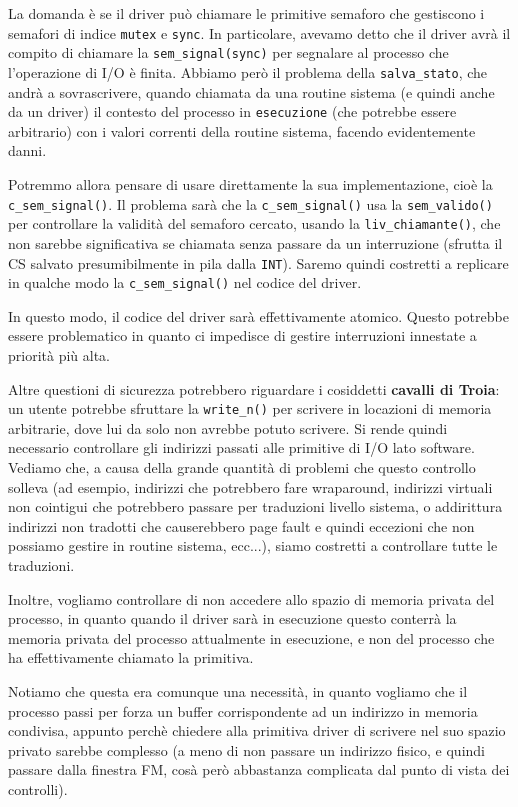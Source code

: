 \documentclass[a4paper,11pt]{article}
\begin{document}
La domanda è se il driver può chiamare le primitive semaforo che gestiscono i semafori di indice \lstinline|mutex| e \lstinline|sync|.
In particolare, avevamo detto che il driver avrà il compito di chiamare la \lstinline|sem_signal(sync)| per segnalare al processo che l'operazione di I/O è finita.
Abbiamo però il problema della \lstinline|salva_stato|, che andrà a sovrascrivere, quando chiamata da una routine sistema (e quindi anche da un driver) il contesto del processo in \lstinline|esecuzione| (che potrebbe essere arbitrario) con i valori correnti della routine sistema, facendo evidentemente danni. 

Potremmo allora pensare di usare direttamente la sua implementazione, cioè la \lstinline|c_sem_signal()|.
Il problema sarà che la \lstinline|c_sem_signal()| usa la \lstinline|sem_valido()| per controllare la validità del semaforo cercato, usando la \lstinline|liv_chiamante()|, che non sarebbe significativa se chiamata senza passare da un interruzione (sfrutta il CS salvato presumibilmente in pila dalla \lstinline|INT|).
Saremo quindi costretti a replicare in qualche modo la \lstinline|c_sem_signal()| nel codice del driver.

In questo modo, il codice del driver sarà effettivamente atomico.
Questo potrebbe essere problematico in quanto ci impedisce di gestire interruzioni innestate a priorità più alta.

Altre questioni di sicurezza potrebbero riguardare i cosiddetti \textbf{cavalli di Troia}: un utente potrebbe sfruttare la \lstinline|write_n()| per scrivere in locazioni di memoria arbitrarie, dove lui da solo non avrebbe potuto scrivere.
Si rende quindi necessario controllare gli indirizzi passati alle primitive di I/O lato software.
Vediamo che, a causa della grande quantità di problemi che questo controllo solleva (ad esempio, indirizzi che potrebbero fare wraparound, indirizzi virtuali non cointigui che potrebbero passare per traduzioni livello sistema, o addirittura indirizzi non tradotti che causerebbero page fault e quindi eccezioni che non possiamo gestire in routine sistema, ecc...), siamo costretti a controllare tutte le traduzioni.

Inoltre, vogliamo controllare di non accedere allo spazio di memoria privata del processo, in quanto quando il driver sarà in esecuzione questo conterrà la memoria privata del processo attualmente in esecuzione, e non del processo che ha effettivamente chiamato la primitiva.

Notiamo che questa era comunque una necessità, in quanto vogliamo che il processo passi per forza un buffer corrispondente ad un indirizzo in memoria condivisa, appunto perchè chiedere alla primitiva driver di scrivere nel suo spazio privato sarebbe complesso (a meno di non passare un indirizzo fisico, e quindi passare dalla finestra FM, cosà però abbastanza complicata dal punto di vista dei controlli).
\end{document}
